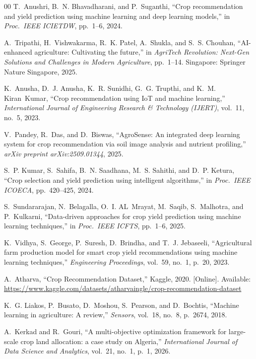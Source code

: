 \documentclass[conference]{IEEEtran}
\begin{document}
\begin{thebibliography}{00}
T.~Anushri, B.~N. Bhavadharani, and P.~Suganthi,
``Crop recommendation and yield prediction using machine learning and deep
learning models,''
in \textit{Proc.\ IEEE ICIETDW}, pp.~1--6, 2024.

A.~Tripathi, H.~Vishwakarma, R.~K. Patel, A.~Shukla, and S.~S. Chouhan,
``AI-enhanced agriculture: Cultivating the future,''
in \textit{AgriTech Revolution: Next-Gen Solutions and Challenges in Modern
Agriculture}, pp.~1--14. Singapore: Springer Nature Singapore, 2025.

K.~Anusha, D.~J. Anusha, K.~R. Sunidhi, G.~G. Trupthi, and K.~M. Kiran~Kumar,
``Crop recommendation using IoT and machine learning,''
\textit{International Journal of Engineering Research \& Technology (IJERT)},
vol.~11, no.~5, 2023.

V.~Pandey, R.~Das, and D.~Biswas,
``AgroSense: An integrated deep learning system for crop recommendation via
soil image analysis and nutrient profiling,''
\textit{arXiv preprint arXiv:2509.01344}, 2025.

S.~P. Kumar, S.~Sahifa, B.~N. Saadhana, M.~S. Sahithi, and D.~P. Ketura,
``Crop selection and yield prediction using intelligent algorithms,''
in \textit{Proc.\ IEEE ICOECA}, pp.~420--425, 2024.

S.~Sundararajan, N.~Belagalla, O.~I. AL~Mrayat, M.~Saqib, S.~Malhotra,
and P.~Kulkarni,
``Data-driven approaches for crop yield prediction using machine learning
techniques,''
in \textit{Proc.\ IEEE ICFTS}, pp.~1--6, 2025.

K.~Vidhya, S.~George, P.~Suresh, D.~Brindha, and T.~J. Jebaseeli,
``Agricultural farm production model for smart crop yield recommendations
using machine learning techniques,''
\textit{Engineering Proceedings}, vol.~59, no.~1, p.~20, 2023.

A.~Atharva,
``Crop Recommendation Dataset,''
Kaggle, 2020. [Online].
Available: \url{https://www.kaggle.com/datasets/atharvaingle/crop-recommendation-dataset}

K.~G. Liakos, P.~Busato, D.~Moshou, S.~Pearson, and D.~Bochtis,
``Machine learning in agriculture: A review,''
\textit{Sensors}, vol.~18, no.~8, p.~2674, 2018.

A.~Kerkad and R.~Gouri,
``A multi-objective optimization framework for large-scale crop land allocation: a case study on {A}lgeria,''
\textit{International Journal of Data Science and Analytics}, vol.~21, no.~1, p.~1, 2026.


\end{thebibliography}
\end{document}
